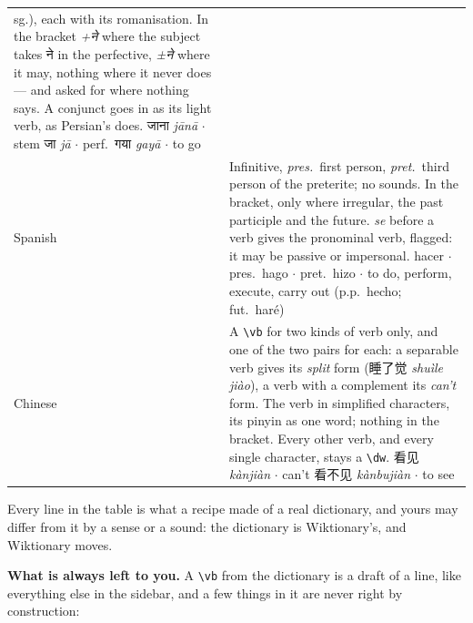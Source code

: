 \documentclass[11pt,oneside]{report}
\newcommand{\sw}[1]{\foreignlanguage{spanish}{\emph{#1}}}
\newcommand{\hw}[1]{\mbox{\foreignlanguage{hindi}{#1}}}
\newcommand{\cw}[1]{\mbox{\foreignlanguage{chinese}{#1}}}
\begin{document}
\begin{center}
\begin{longtable}{@{}>{\raggedright\arraybackslash}p{}>{\raggedright\arraybackslash}p{}@{}}
  sg.), each with its romanisation. In the bracket \emph{+\hw{ने}} where the
  subject takes \hw{ने} in the perfective, \emph{±\hw{ने}} where it may,
  nothing where it never does --- and asked for where nothing says. A
  conjunct goes in as its light verb, as Persian's does. \newline
  \hw{जाना} \emph{jānā} $\cdot$ stem \hw{जा} \emph{jā} $\cdot$ perf.\
  \hw{गया} \emph{gayā} $\cdot$ to go \\
\addlinespace
\textsf{Spanish} & Infinitive, \emph{pres.}\ first person, \emph{pret.}\
  third person of the preterite; no sounds. In the bracket, only where
  irregular, the past participle and the future. \sw{se} before a verb gives
  the pronominal verb, flagged: it may be passive or impersonal. \newline
  hacer $\cdot$ pres.\ hago $\cdot$ pret.\ hizo $\cdot$ to do, perform,
  execute, carry out (p.p.\ hecho; fut.\ haré) \\
\addlinespace
\textsf{Chinese} & A \texttt{\textbackslash vb} for two kinds of verb only,
  and one of the two pairs for each: a separable verb gives its \emph{split}
  form (\cw{睡了觉} \emph{shuìle jiào}), a verb with a complement its
  \emph{can't} form. The verb in simplified characters, its pinyin as one
  word; nothing in the bracket. Every other verb, and every single
  character, stays a \texttt{\textbackslash dw}.
  \newline
  \cw{看见} \emph{kànjiàn} $\cdot$ can't \cw{看不见} \emph{kànbujiàn}
  $\cdot$ to see \\
\bottomrule
\end{longtable}
\end{center}

\noindent Every line in the table is what a recipe made of a real
dictionary, and yours may differ from it by a sense or a sound: the
dictionary is Wiktionary's, and Wiktionary moves.

\textbf{What is always left to you.} A \texttt{\textbackslash vb} from the
dictionary is a draft of a line, like everything else in the sidebar, and a
few things in it are never right by construction:
\end{document}
